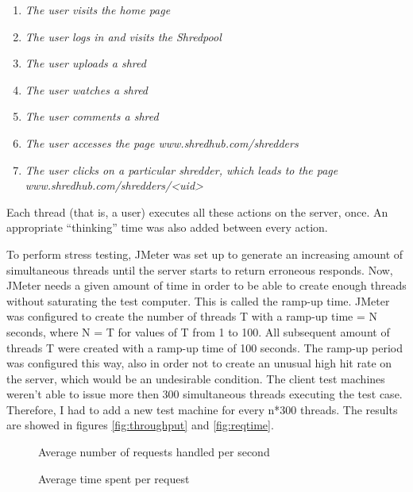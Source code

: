 \begin{enumerate}
\item \textit{The user visits the home page}
\item \textit{The user logs in and visits the Shredpool}
\item \textit{The user uploads a shred}
\item \textit{The user watches a shred}
\item \textit{The user comments a shred}
\item \textit{The user accesses the page www.shredhub.com/shredders}
\item \textit{The user clicks on a particular shredder, which leads to the page www.shredhub.com/shredders/<uid>}
\end{enumerate}

Each thread (that is, a user) executes all these actions on the server, once. An appropriate ``thinking'' time was also added between every action.

To perform stress testing,  JMeter was set up to generate an increasing amount of simultaneous threads until the server starts to return erroneous responds. Now, JMeter needs a given amount of time in order to be able to create enough threads without saturating the test computer. This is called the ramp-up time. JMeter was configured to create the number of threads T with a ramp-up time = N seconds, where N = T for values of T from 1 to 100. All subsequent amount of threads T were created with a ramp-up time of 100 seconds. The ramp-up period was configured this way, also in order not to create an unusual high hit rate on the server, which would be an undesirable condition. The client test machines weren't able to issue more then 300 simultaneous threads executing the test case. Therefore, I had to add a new test machine for every n*300 threads. The results are showed in figures \vref{fig:throughput} and \vref{fig:reqtime}.

\begin{figure}
\begin{center}
\end{center}
\caption{Average number of requests handled per second}
\label{fig:throughput}
\end{figure}

\begin{figure}
\begin{center}
\end{center}
\caption{Average time spent per request}
\label{fig:reqtime}
\end{figure}

